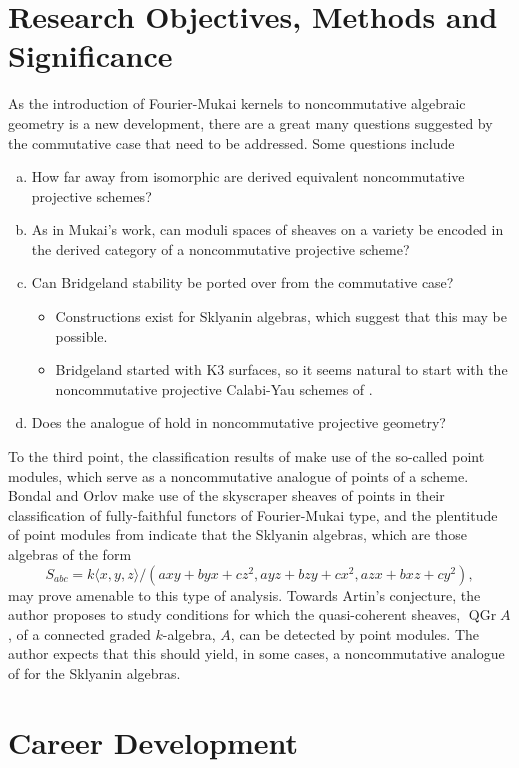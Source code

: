 \documentclass[11pt]{article}
\begin{document}
\section{Research Objectives, Methods and Significance}
As the introduction of Fourier-Mukai kernels to noncommutative algebraic geometry is a new development, there are a great many questions suggested by the commutative case that need to be addressed.
Some questions include
\begin{enumerate}[(a)]
\item
  How far away from isomorphic are derived equivalent noncommutative projective schemes?
\item
  As in Mukai's work, can moduli spaces of sheaves on a variety be encoded in the derived category of a noncommutative projective scheme?
\item
  Can Bridgeland stability be ported over from the commutative case?
  \begin{itemize}
  \item
    Constructions exist for Sklyanin algebras, which suggest that this may be possible.
  \item
    Bridgeland started with K3 surfaces, so it seems natural to start with the noncommutative projective Calabi-Yau schemes of \cite{kanazawa2015}.
  \end{itemize}
    \item
    Does the analogue of \cite{Bondal-Orlov} hold in noncommutative projective geometry?
\end{enumerate}
To the third point, the classification results of \cite{ATV} make use of the so-called point modules, which serve as a noncommutative analogue of points of a scheme.
Bondal and Orlov make use of the skyscraper sheaves of points in their classification of fully-faithful functors of Fourier-Mukai type, and the plentitude of point modules from \cite{ATV} indicate that the Sklyanin algebras, which are those algebras of the form
$$S_{abc} = k\langle x,y,z \rangle/(axy + byx + cz^2, ayz + bzy + cx^2, azx + bxz + cy^2),$$
may prove amenable to this type of analysis.
Towards Artin's conjecture, the author proposes to study conditions for which the quasi-coherent sheaves, $\operatorname{QGr} A$, of a connected graded $k$-algebra, $A$, can be detected by point modules.
The author expects that this should yield, in some cases, a noncommutative analogue of \cite{Bondal-Orlov} for the Sklyanin algebras.


\section{Career Development}
\end{document}
